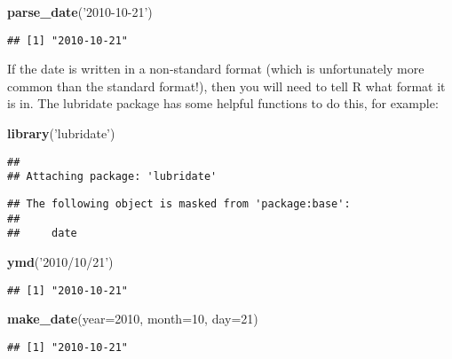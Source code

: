 \documentclass[
]{article}
\newenvironment{Shaded}{\begin{snugshade}}{\end{snugshade}}
\newcommand{\DataTypeTok}[1]{\textcolor[rgb]{0.13,0.29,0.53}{#1}}
\newcommand{\DecValTok}[1]{\textcolor[rgb]{0.00,0.00,0.81}{#1}}
\newcommand{\KeywordTok}[1]{\textcolor[rgb]{0.13,0.29,0.53}{\textbf{#1}}}
\newcommand{\NormalTok}[1]{#1}
\newcommand{\StringTok}[1]{\textcolor[rgb]{0.31,0.60,0.02}{#1}}
\begin{document}
\begin{Shaded}
\begin{Highlighting}[]
\KeywordTok{parse_date}\NormalTok{(}\StringTok{'2010-10-21'}\NormalTok{)}
\end{Highlighting}
\end{Shaded}

\begin{verbatim}
## [1] "2010-10-21"
\end{verbatim}

If the date is written in a non-standard format (which is unfortunately
more common than the standard format!), then you will need to tell R
what format it is in. The lubridate package has some helpful functions
to do this, for example:

\begin{Shaded}
\begin{Highlighting}[]
\KeywordTok{library}\NormalTok{(}\StringTok{'lubridate'}\NormalTok{)}
\end{Highlighting}
\end{Shaded}

\begin{verbatim}
## 
## Attaching package: 'lubridate'
\end{verbatim}

\begin{verbatim}
## The following object is masked from 'package:base':
## 
##     date
\end{verbatim}

\begin{Shaded}
\begin{Highlighting}[]
\KeywordTok{ymd}\NormalTok{(}\StringTok{'2010/10/21'}\NormalTok{)}
\end{Highlighting}
\end{Shaded}

\begin{verbatim}
## [1] "2010-10-21"
\end{verbatim}

\begin{Shaded}
\begin{Highlighting}[]
\KeywordTok{make_date}\NormalTok{(}\DataTypeTok{year=}\DecValTok{2010}\NormalTok{, }\DataTypeTok{month=}\DecValTok{10}\NormalTok{, }\DataTypeTok{day=}\DecValTok{21}\NormalTok{)}
\end{Highlighting}
\end{Shaded}

\begin{verbatim}
## [1] "2010-10-21"
\end{verbatim}
\end{document}
